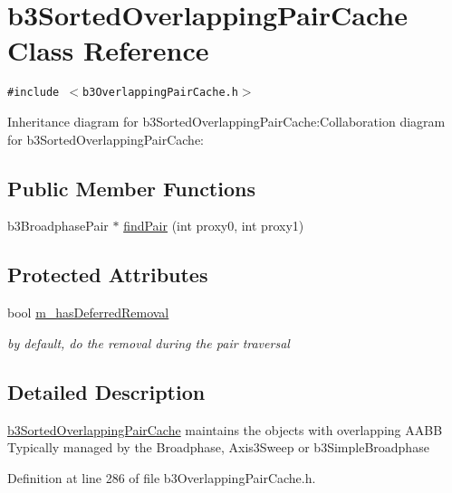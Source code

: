 \hypertarget{classb3_sorted_overlapping_pair_cache}{
\section{b3SortedOverlappingPairCache Class Reference}
\label{classb3_sorted_overlapping_pair_cache}
}
{\tt \#include $<$b3OverlappingPairCache.h$>$}

Inheritance diagram for b3SortedOverlappingPairCache:Collaboration diagram for b3SortedOverlappingPairCache:\subsection*{Public Member Functions}
\begin{CompactItemize}
\item 
b3BroadphasePair $\ast$ \hyperlink{classb3_sorted_overlapping_pair_cache_d24f6d5bfc4b9e378ace06bcb10519ea}{findPair} (int proxy0, int proxy1)
\end{CompactItemize}
\subsection*{Protected Attributes}
\begin{CompactItemize}
\item 
\hypertarget{classb3_sorted_overlapping_pair_cache_ebe6abcf2a675cda50246430a4e5cea4}{
bool \hyperlink{classb3_sorted_overlapping_pair_cache_ebe6abcf2a675cda50246430a4e5cea4}{m\_\-hasDeferredRemoval}}
\label{classb3_sorted_overlapping_pair_cache_ebe6abcf2a675cda50246430a4e5cea4}

\begin{CompactList}\small\item\em by default, do the removal during the pair traversal \item\end{CompactList}\end{CompactItemize}


\subsection{Detailed Description}
\hyperlink{classb3_sorted_overlapping_pair_cache}{b3SortedOverlappingPairCache} maintains the objects with overlapping AABB Typically managed by the Broadphase, Axis3Sweep or b3SimpleBroadphase 

Definition at line 286 of file b3OverlappingPairCache.h.

